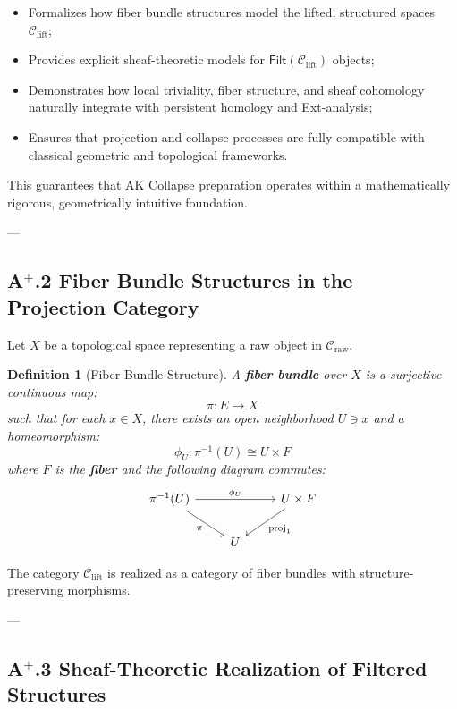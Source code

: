 \documentclass[11pt]{article}
\newtheorem{definition}[theorem]{Definition}
\begin{document}
\begin{itemize}
    \item Formalizes how fiber bundle structures model the lifted, structured spaces $\mathcal{C}_{\mathrm{lift}}$;
    \item Provides explicit sheaf-theoretic models for $\mathsf{Filt}(\mathcal{C}_{\mathrm{lift}})$ objects;
    \item Demonstrates how local triviality, fiber structure, and sheaf cohomology naturally integrate with persistent homology and Ext-analysis;
    \item Ensures that projection and collapse processes are fully compatible with classical geometric and topological frameworks.
\end{itemize}

This guarantees that AK Collapse preparation operates within a mathematically rigorous, geometrically intuitive foundation.

---

\subsection*{A$^{+}$.2 Fiber Bundle Structures in the Projection Category}

Let $X$ be a topological space representing a raw object in $\mathcal{C}_{\mathrm{raw}}$.

\begin{definition}[Fiber Bundle Structure]
A \textbf{fiber bundle} over $X$ is a surjective continuous map:
\[
\pi : E \longrightarrow X
\]
such that for each $x \in X$, there exists an open neighborhood $U \ni x$ and a homeomorphism:
\[
\phi_U : \pi^{-1}(U) \cong U \times F
\]
where $F$ is the \textbf{fiber} and the following diagram commutes:
\[
\begin{tikzcd}
\pi^{-1}(U) \arrow[rr, "\phi_U"] \arrow[dr, "\pi"']
& & U \times F \arrow[dl, "\mathrm{proj}_1"] \\
& U &
\end{tikzcd}
\]
\end{definition}

The category $\mathcal{C}_{\mathrm{lift}}$ is realized as a category of fiber bundles with structure-preserving morphisms.

---

\subsection*{A$^{+}$.3 Sheaf-Theoretic Realization of Filtered Structures}
\end{document}
